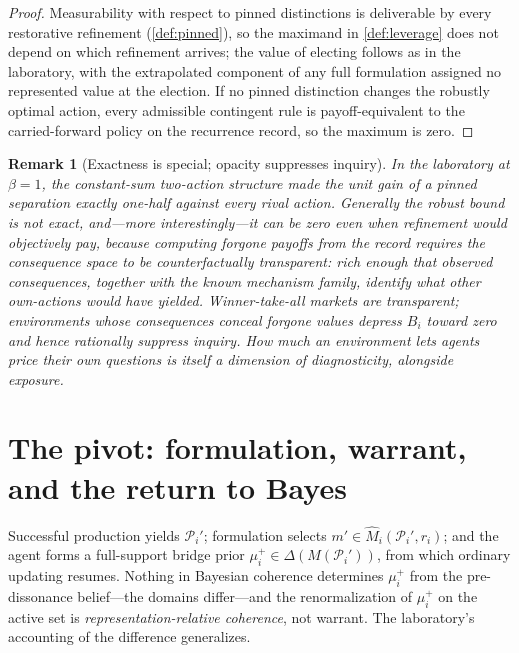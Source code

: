 \documentclass[11pt]{article}
\newtheorem{remark}[assumption]{Remark}
\begin{document}
\begin{proof}
Measurability with respect to pinned distinctions is deliverable by every
restorative refinement (\cref{def:pinned}), so the maximand in
\cref{def:leverage} does not depend on which refinement arrives; the value of
electing follows as in the laboratory, with the extrapolated component of any
full formulation assigned no represented value at the election.  If no pinned
distinction changes the robustly optimal action, every admissible contingent
rule is payoff-equivalent to the carried-forward policy on the recurrence
record, so the maximum is zero.
\end{proof}

\begin{remark}[Exactness is special; opacity suppresses inquiry]
\label{rem:leverage-qualified}
In the laboratory at $\beta=1$, the constant-sum two-action structure made the
unit gain of a pinned separation exactly one-half against every rival action.
Generally the robust bound is not exact, and---more interestingly---it can be
zero even when refinement would objectively pay, because computing forgone
payoffs from the record requires the consequence space to be
\emph{counterfactually transparent}: rich enough that observed consequences,
together with the known mechanism family, identify what other own-actions
would have yielded.  Winner-take-all markets are transparent; environments
whose consequences conceal forgone values depress $B_i$ toward zero and hence
rationally suppress inquiry.  How much an environment lets agents price their
own questions is itself a dimension of diagnosticity, alongside exposure.
\end{remark}

\section{The pivot: formulation, warrant, and the return to Bayes}
\label{sec:pivot}

Successful production yields $\mathcal P_i'$; formulation selects
$m'\in\widehat M_i(\mathcal P_i',r_i)$; and the agent forms a full-support
bridge prior $\mu_i^{+}\in\Delta(M(\mathcal P_i'))$, from which ordinary
updating resumes.  Nothing in Bayesian coherence determines $\mu_i^{+}$ from
the pre-dissonance belief---the domains differ---and the renormalization of
$\mu_i^{+}$ on the active set is \emph{representation-relative coherence},
not warrant.  The laboratory's accounting of the difference generalizes.
\end{document}
